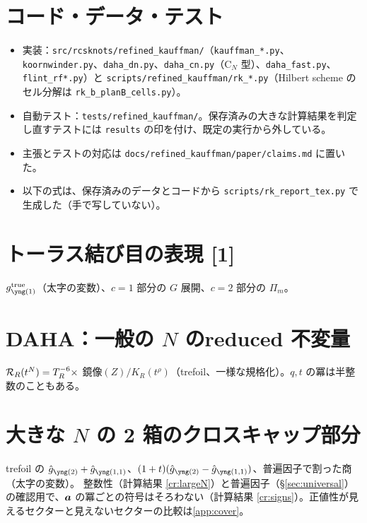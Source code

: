 \section{コード・データ・テスト}\label{app:code}
\begin{itemize}
\item 実装：\texttt{src/rcsknots/refined\_kauffman/}（\texttt{kauffman\_*.py}、\texttt{koornwinder.py}、\texttt{daha\_dn.py}、\texttt{daha\_cn.py}（C$_N$ 型）、\texttt{daha\_fast.py}、\texttt{flint\_rf*.py}）と \texttt{scripts/refined\_kauffman/rk\_*.py}（Hilbert scheme のセル分解は \texttt{rk\_b\_planB\_cells.py}）。
\item 自動テスト：\texttt{tests/refined\_kauffman/}。保存済みの大きな計算結果を判定し直すテストには \texttt{results} の印を付け、既定の実行から外している。
\item 主張とテストの対応は \texttt{docs/refined\_kauffman/paper/claims.md} に置いた。
\item 以下の式は、保存済みのデータとコードから \texttt{scripts/rk\_report\_tex.py} で生成した（手で写していない）。
\end{itemize}

\section{トーラス結び目の表現 [1]}\label{app:torus}
$g^{\mathrm{true}}_{\yone}$（太字の変数）、$c = 1$ 部分の $G$ 展開、$c = 2$ 部分の $\Pi_m$。


\section{DAHA：一般の $N$ のreduced 不変量}\label{app:daha}
$\mathcal{R}_R(t^N) = T_R^{-6}\times$ 鏡像$(Z)/K_R(t^\rho)$（trefoil、一様な規格化）。$q, t$ の冪は半整数のこともある。


\section{大きな $N$ の 2 箱のクロスキャップ部分}\label{app:largeN}
trefoil の $\hat g_{\ytwo} + \hat g_{\yoneone}$、$(1+t)(\hat g_{\ytwo} - \hat g_{\yoneone})$、普遍因子で割った商（太字の変数）。
整数性（計算結果 \ref{cr:largeN}）と普遍因子（§\ref{sec:universal}）の確認用で、$\bm{a}$ の冪ごとの符号はそろわない（計算結果 \ref{cr:signs}）。正値性が見えるセクターと見えないセクターの比較は\ref{app:cover}。


